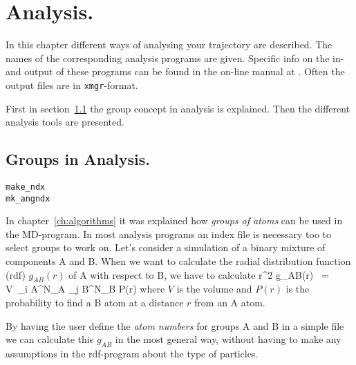 \chapter{Analysis.}
\label{ch:analysis}
In this chapter different ways of analysing your trajectory are described. 
The names of the corresponding analysis programs are given. 
Specific info on the in- and output of these programs can be found 
in the on-line manual at {\wwwpage}.
Often the output files are in {\tt xmgr}-format.

First in section~\ref{sec:groups} the group concept in analysis is explained. 
Then the different analysis tools are presented.
%
%
\section{Groups in Analysis.}
\label{sec:groups}
\begin{verbatim}
make_ndx
mk_angndx
\end{verbatim}
In chapter~\ref{ch:algorithms} it was explained how {\em groups of atoms} can 
be used in the MD-program. 
In most analysis programs an index file is necessary too to select groups to
work on. Let's consider a simulation of a binary mixture of components A and
B. When we want to calculate the radial distribution function (rdf) 
$g_{AB}(r)$ of A with respect to B, we have to calculate
\pi r^2 g_{AB}(r)	~=~	V~\sum_{i \in A}^{N_A} \sum_{j \in B}^{N_B} P(r)
\eeq
where $V$ is the volume and $P(r)$ is the probability to find a B atom
at a distance $r$ from an A atom.

By having the user define the {\em atom numbers} for groups A and B in
a simple file we can calculate this $g_{AB}$ in the most general way, without
having to make any assumptions in the rdf-program about the type of 
particles. 


